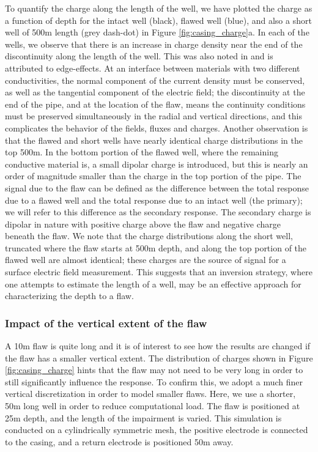 To quantify the charge along the length of the well, we have plotted the charge as a function of depth for the intact well (black), flawed well (blue), and also a short well of 500m length (grey dash-dot) in Figure \ref{fig:casing_charge}a. In each of the wells, we observe that there is an increase in charge density near the end of the discontinuity along the length of the well. This was also noted  in \cite{Griffiths1997, Heagy2018a} and is attributed to edge-effects. At an interface between materials with two different conductivities, the normal component of the current density must be conserved, as well as the tangential component of the electric field; the discontinuity at the end of the pipe, and at the location of the flaw, means the continuity conditions must be preserved simultaneously in the radial and vertical directions, and this complicates the behavior of the fields, fluxes and charges. Another observation is that the flawed and short wells have nearly identical charge distributions in the top 500m. In the bottom portion of the flawed well, where the remaining conductive material is, a small dipolar charge is introduced, but this is nearly an order of magnitude smaller than the charge in the top portion of the pipe. The signal due to the flaw can be defined as the difference between the total response due to a flawed well and the total response due to an intact well (the primary); we will refer to this difference as the secondary response. The secondary charge is dipolar in nature with positive charge above the flaw and negative charge beneath the flaw. We note that the charge distributions along the short well, truncated where the flaw starts at 500m depth, and along the top portion of the flawed well are almost identical; these charges are the source of signal for a surface electric field measurement. This suggests that an inversion strategy, where one attempts to estimate the length of a well, may be an effective approach for characterizing the depth to a flaw.




\subsubsection{Impact of the vertical extent of the flaw}

A 10m flaw is quite long and it is of interest to see how the results are changed if the flaw has a smaller vertical extent. The distribution of charges shown in Figure \ref{fig:casing_charge} hints that the flaw may not need to be very long in order to still significantly influence the response. To confirm this, we adopt a much finer vertical discretization in order to model smaller flaws. Here, we use a shorter, 50m long well in order to reduce computational load. The flaw is positioned at 25m depth, and the length of the impairment is varied. This simulation is conducted on a cylindrically symmetric mesh, the positive electrode is connected to the casing, and a return electrode is positioned 50m away.

